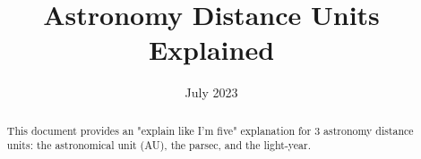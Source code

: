 \documentclass[12pt, letterpaper]{article}
\title{Astronomy Distance Units Explained}
\date{July 2023}
\begin{document}
\maketitle
\begin{abstract}
This document provides an "explain like I'm five" explanation for 3 astronomy distance units: the
astronomical unit (AU), the parsec, and the light-year.
\end{abstract}
\end{document}
